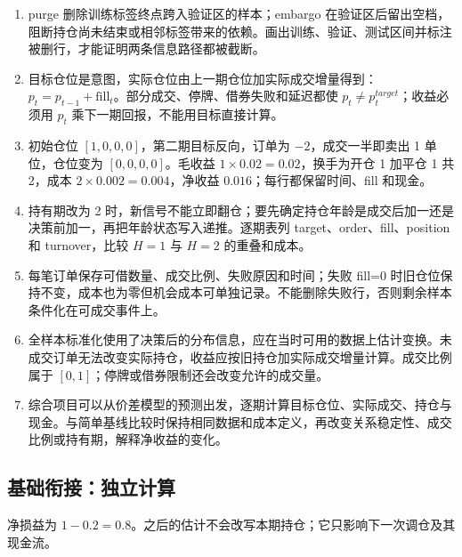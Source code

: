 
\begin{enumerate}[leftmargin=*]
  \item purge 删除训练标签终点跨入验证区的样本；embargo 在验证区后留出空档，阻断持仓尚未结束或相邻标签带来的依赖。画出训练、验证、测试区间并标注被删行，才能证明两条信息路径都被截断。
  \item 目标仓位是意图，实际仓位由上一期仓位加实际成交增量得到：$p_t=p_{t-1}+\mathrm{fill}_t$。部分成交、停牌、借券失败和延迟都使 $p_t\ne p_t^{target}$；收益必须用 $p_t$ 乘下一期回报，不能用目标直接计算。
  \item 初始仓位 $[1,0,0,0]$，第二期目标反向，订单为 $-2$，成交一半即卖出 1 单位，仓位变为 $[0,0,0,0]$。毛收益 $1\times0.02=0.02$，换手为开仓 1 加平仓 1 共 2，成本 $2\times0.002=0.004$，净收益 $0.016$；每行都保留时间、fill 和现金。
  \item 持有期改为 2 时，新信号不能立即翻仓；要先确定持仓年龄是成交后加一还是决策前加一，再把年龄状态写入递推。逐期表列 target、order、fill、position 和 turnover，比较 $H=1$ 与 $H=2$ 的重叠和成本。
  \item 每笔订单保存可借数量、成交比例、失败原因和时间；失败 fill=0 时旧仓位保持不变，成本也为零但机会成本可单独记录。不能删除失败行，否则剩余样本条件化在可成交事件上。
  \item 全样本标准化使用了决策后的分布信息，应在当时可用的数据上估计变换。未成交订单无法改变实际持仓，收益应按旧持仓加实际成交增量计算。成交比例属于 $[0,1]$；停牌或借券限制还会改变允许的成交量。
  \item 综合项目可以从价差模型的预测出发，逐期计算目标仓位、实际成交、持仓与现金。与简单基线比较时保持相同数据和成本定义，再改变关系稳定性、成交比例或持有期，解释净收益的变化。
\end{enumerate}

\subsection*{基础衔接：独立计算}
净损益为 $1-0.2=0.8$。之后的估计不会改写本期持仓；它只影响下一次调仓及其现金流。
